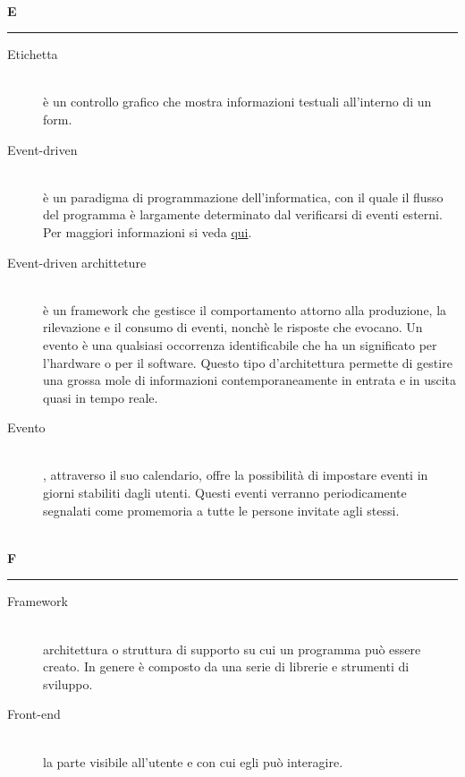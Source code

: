 \documentclass[12pt,a4paper]{article}
\begin{document}
\newpage

\begin{center}
\hfill\\
	\LARGE \textbf{E}
\hfill\\
\rule[15pt]{30pt}{0.5pt}
\end{center}

\begin{description}
\item[Etichetta] 
\hfill\\ è un controllo grafico che mostra informazioni testuali all'interno di un form.

\item[Event-driven] 
\hfill\\ è un paradigma di programmazione dell'informatica, con il quale il flusso del programma è largamente determinato dal verificarsi di eventi esterni. Per maggiori informazioni si veda \href{https://it.wikipedia.org/wiki/Programmazione_a_eventi}{qui}.

\item[Event-driven architteture] 
\hfill\\è un framework che gestisce il comportamento attorno alla produzione, la rilevazione e il consumo di eventi, nonchè le risposte che evocano. Un evento è una qualsiasi occorrenza identificabile che ha un significato per l'hardware o per il software. Questo tipo d'architettura  permette di gestire  una grossa mole di informazioni contemporaneamente  in entrata e in uscita quasi in tempo reale.

\item[Evento] 
\hfill\\ , attraverso il suo calendario, offre la possibilità di impostare eventi in giorni stabiliti dagli utenti. Questi eventi verranno periodicamente segnalati come promemoria a tutte le persone invitate agli stessi.
\end{description}

\newpage

\begin{center}
\hfill\\
	\LARGE \textbf{F}
\hfill\\
\rule[15pt]{30pt}{0.5pt}
\end{center}

\begin{description}
\item[Framework] 
\hfill\\ architettura o struttura di supporto su cui un programma può essere creato. In genere è composto da una serie di librerie e strumenti di sviluppo.

\item[Front-end] 
\hfill\\la parte visibile all'utente e con cui egli può interagire.
\end{description}
\end{document}
